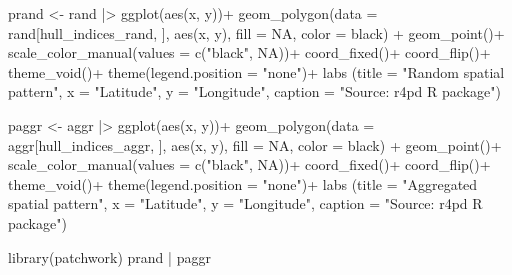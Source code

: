 \documentclass[
  letterpaper,
  DIV=11,
  numbers=noendperiod]{scrreprt}
\newenvironment{Shaded}{\begin{snugshade}}{\end{snugshade}}
\newcommand{\AttributeTok}[1]{\textcolor[rgb]{0.40,0.45,0.13}{#1}}
\newcommand{\ConstantTok}[1]{\textcolor[rgb]{0.56,0.35,0.01}{#1}}
\newcommand{\FunctionTok}[1]{\textcolor[rgb]{0.28,0.35,0.67}{#1}}
\newcommand{\NormalTok}[1]{\textcolor[rgb]{0.00,0.23,0.31}{#1}}
\newcommand{\OtherTok}[1]{\textcolor[rgb]{0.00,0.23,0.31}{#1}}
\newcommand{\SpecialCharTok}[1]{\textcolor[rgb]{0.37,0.37,0.37}{#1}}
\newcommand{\StringTok}[1]{\textcolor[rgb]{0.13,0.47,0.30}{#1}}
\begin{document}
\begin{Shaded}
\begin{Highlighting}[]
\NormalTok{prand }\OtherTok{\textless{}{-}}\NormalTok{ rand }\SpecialCharTok{|\textgreater{}} 
  \FunctionTok{ggplot}\NormalTok{(}\FunctionTok{aes}\NormalTok{(x, y))}\SpecialCharTok{+}
  \FunctionTok{geom\_polygon}\NormalTok{(}\AttributeTok{data =}\NormalTok{ rand[hull\_indices\_rand, ], }\FunctionTok{aes}\NormalTok{(x, y), }\AttributeTok{fill =} \ConstantTok{NA}\NormalTok{, }\AttributeTok{color =} \StringTok{\textquotesingle{}black\textquotesingle{}}\NormalTok{) }\SpecialCharTok{+}
  \FunctionTok{geom\_point}\NormalTok{()}\SpecialCharTok{+}
  \FunctionTok{scale\_color\_manual}\NormalTok{(}\AttributeTok{values =} \FunctionTok{c}\NormalTok{(}\StringTok{"black"}\NormalTok{, }\ConstantTok{NA}\NormalTok{))}\SpecialCharTok{+}
  \FunctionTok{coord\_fixed}\NormalTok{()}\SpecialCharTok{+}
  \FunctionTok{coord\_flip}\NormalTok{()}\SpecialCharTok{+}
  \FunctionTok{theme\_void}\NormalTok{()}\SpecialCharTok{+}
  \FunctionTok{theme}\NormalTok{(}\AttributeTok{legend.position =} \StringTok{"none"}\NormalTok{)}\SpecialCharTok{+}
  \FunctionTok{labs}\NormalTok{ (}\AttributeTok{title =} \StringTok{"Random spatial pattern"}\NormalTok{, }
        \AttributeTok{x =} \StringTok{"Latitude"}\NormalTok{,}
        \AttributeTok{y =} \StringTok{"Longitude"}\NormalTok{,}
        \AttributeTok{caption =} \StringTok{"Source: r4pd R package"}\NormalTok{)}

\NormalTok{paggr }\OtherTok{\textless{}{-}}\NormalTok{ aggr }\SpecialCharTok{|\textgreater{}} 
  \FunctionTok{ggplot}\NormalTok{(}\FunctionTok{aes}\NormalTok{(x, y))}\SpecialCharTok{+}
  \FunctionTok{geom\_polygon}\NormalTok{(}\AttributeTok{data =}\NormalTok{ aggr[hull\_indices\_aggr, ], }\FunctionTok{aes}\NormalTok{(x, y), }\AttributeTok{fill =} \ConstantTok{NA}\NormalTok{, }\AttributeTok{color =} \StringTok{\textquotesingle{}black\textquotesingle{}}\NormalTok{) }\SpecialCharTok{+}
  \FunctionTok{geom\_point}\NormalTok{()}\SpecialCharTok{+}
  \FunctionTok{scale\_color\_manual}\NormalTok{(}\AttributeTok{values =} \FunctionTok{c}\NormalTok{(}\StringTok{"black"}\NormalTok{, }\ConstantTok{NA}\NormalTok{))}\SpecialCharTok{+}
  \FunctionTok{coord\_fixed}\NormalTok{()}\SpecialCharTok{+}
  \FunctionTok{coord\_flip}\NormalTok{()}\SpecialCharTok{+}
  \FunctionTok{theme\_void}\NormalTok{()}\SpecialCharTok{+}
  \FunctionTok{theme}\NormalTok{(}\AttributeTok{legend.position =} \StringTok{"none"}\NormalTok{)}\SpecialCharTok{+}
  \FunctionTok{labs}\NormalTok{ (}\AttributeTok{title =} \StringTok{"Aggregated spatial pattern"}\NormalTok{, }
        \AttributeTok{x =} \StringTok{"Latitude"}\NormalTok{,}
        \AttributeTok{y =} \StringTok{"Longitude"}\NormalTok{,}
        \AttributeTok{caption =} \StringTok{"Source: r4pd R package"}\NormalTok{)}

\FunctionTok{library}\NormalTok{(patchwork)}
\NormalTok{prand }\SpecialCharTok{|}\NormalTok{ paggr}
\end{Highlighting}
\end{Shaded}
\end{document}
